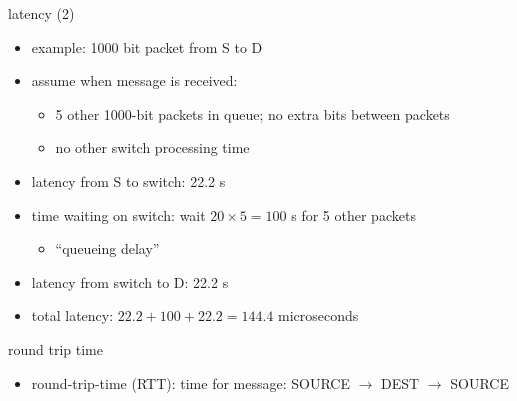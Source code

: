 \begin{frame}{latency (2)}
    \begin{itemize}
    \item example: 1000 bit packet from S to D
    \item assume when message is received:
        \begin{itemize}
        \item 5 other 1000-bit packets in queue; no extra bits between packets
        \item no other switch processing time
        \end{itemize}
    \end{itemize}
\begin{itemize}
\item latency from S to switch: 22.2 \mu s 
\item time waiting on switch: wait $20\times5=100$ \mu s for 5 other packets
    \begin{itemize}
    \item ``queueing delay''
    \end{itemize}
\item latency from switch to D: 22.2 \mu s 
\item total latency: $22.2 + 100 + 22.2 = 144.4$ microseconds
\end{itemize}
\end{frame}

\begin{frame}{round trip time}
    \begin{itemize}
    \item round-trip-time (RTT): time for message: SOURCE $\rightarrow$ DEST $\rightarrow$ SOURCE
    \end{itemize}
\end{frame}

